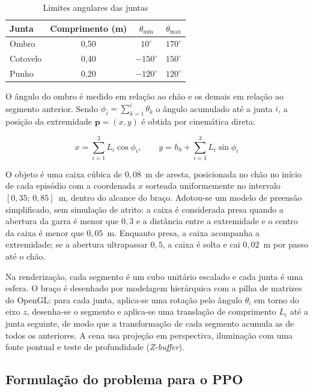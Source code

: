 \begin{table}[htb]
    \centering
    \caption{Limites angulares das juntas}
    \label{tab:juntas}
    \begin{tabular}{lccc}
        \hline
        Junta & Comprimento (m) & $\theta_{\min}$ & $\theta_{\max}$ \\
        \hline
        Ombro    & 0,50 & $10^\circ$   & $170^\circ$ \\
        Cotovelo & 0,40 & $-150^\circ$ & $150^\circ$ \\
        Punho    & 0,20 & $-120^\circ$ & $120^\circ$ \\
        \hline
    \end{tabular}
\end{table}

O ângulo do ombro é medido em relação ao chão e os demais em relação ao segmento anterior. Sendo $\phi_i = \sum_{k=1}^{i} \theta_k$ o ângulo acumulado até a junta $i$, a posição da extremidade $\mathbf{p} = (x, y)$ é obtida por cinemática direta:

\begin{equation}
    x = \sum_{i=1}^{3} L_i \cos \phi_i, \qquad
    y = h_b + \sum_{i=1}^{3} L_i \sin \phi_i
    \label{eq:cinematica}
\end{equation}

O objeto é uma caixa cúbica de $0{,}08$~m de aresta, posicionada no chão no início de cada episódio com a coordenada $x$ sorteada uniformemente no intervalo $[0{,}35;\,0{,}85]$~m, dentro do alcance do braço. Adotou-se um modelo de preensão simplificado, sem simulação de atrito: a caixa é considerada presa quando a abertura da garra é menor que $0{,}3$ e a distância entre a extremidade e o centro da caixa é menor que $0{,}05$~m. Enquanto presa, a caixa acompanha a extremidade; se a abertura ultrapassar $0{,}5$, a caixa é solta e cai $0{,}02$~m por passo até o chão.

Na renderização, cada segmento é um cubo unitário escalado e cada junta é uma esfera. O braço é desenhado por modelagem hierárquica com a pilha de matrizes do OpenGL: para cada junta, aplica-se uma rotação pelo ângulo $\theta_i$ em torno do eixo $z$, desenha-se o segmento e aplica-se uma translação de comprimento $L_i$ até a junta seguinte, de modo que a transformação de cada segmento acumula as de todos os anteriores. A cena usa projeção em perspectiva, iluminação com uma fonte pontual e teste de profundidade (\textit{Z-buffer}).

\subsection{Formulação do problema para o PPO}

